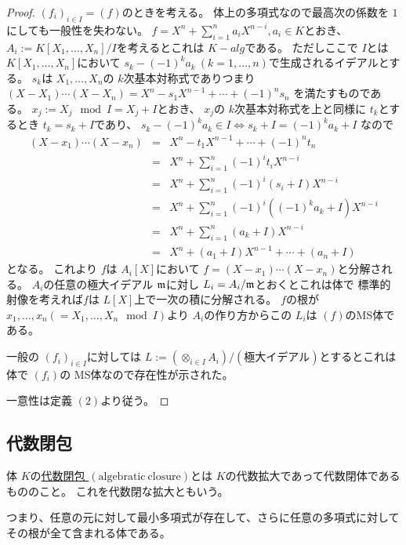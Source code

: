 \documentclass[../master_galois_theory]{subfiles}
\begin{document}
\begin{proof}
  $(f_i)_{i \in I} = (f)$のときを考える。
  体上の多項式なので最高次の係数を $1$にしても一般性を失わない。
  $f = X^n + \sum_{i = 1}^n a_i X^{n-i} , a_i \in K$とおき、
  $A_i := K[X_1 , \dots , X_n]/ I$を考えるとこれは $K-alg$である。
  ただしここで $I$とは $K[X_1 , \dots , X_n]$において
  $s_k - (-1)^k a_k \  (k = 1 , \dots , n)$で生成されるイデアルとする。
  $s_k$は $X_1 , \dots , X_n$の $k$次基本対称式でありつまり
  $(X - X_1) \cdots (X - X_n) = X^n - s_1 X^{n-1} + \cdots + (-1)^n s_n$
  を満たすものである。
  $x_j := X_j \mod I = X_j + I$とおき、 $x_j$の $k$次基本対称式を上と同様に $t_k$とするとき
  $t_k = s_k + I$であり、
  $s_k - (-1)^k a_k \in I \Leftrightarrow s_k + I = (-1)^k a_k + I$
  なので
  \begin{eqnarray*}
    (X - x_1) \cdots (X - x_n) & = & X^n - t_1 X^{n-1} + \cdots + (-1)^n t_n \\
    & = & X^n + \sum_{i=1}^n (-1)^i t_i X^{n-i} \\
    & = & X^n + \sum_{i=1}^n (-1)^i (s_i + I) X^{n-i} \\
    & = & X^n + \sum_{i=1}^n (-1)^i ((-1)^k a_k + I) X^{n-i} \\
    & = & X^n + \sum_{i=1}^n (a_k + I) X^{n-i} \\
    & = & X^n + (a_1 + I) X^{n-1} + \cdots + (a_n + I)
  \end{eqnarray*}
  となる。
  これより $f$は $A_i[X]$において $f = (X - x_1) \cdots (X - x_n)$と分解される。
  $A_i$の任意の極大イデアル $\mathfrak{m}$に対し $L_i = A_i/\mathfrak{m}$とおくとこれは体で
  標準的射像を考えれば$f$は $L[X]$上で一次の積に分解される。
  $f$の根が $x_1 , \dots , x_n (= X_1 , \dots , X_n \mod I)$より
  $A_i$の作り方からこの $L_i$は $(f)$の\rm{MS}体である。

  一般の $(f_i)_{i \in I}$に対しては
  $L := (\otimes_{i \in I} A_i) / (極大イデアル)$とするとこれは体で
  $(f_i)$の \rm{MS}体なので存在性が示された。

  一意性は定義 $(2)$より従う。
\end{proof}

\subsection{代数閉包}

\begin{defi}
  体 $K$の\underline{代数閉包 $(\mathrm{algebratic \  closure})$}とは
  $K$の代数拡大であって代数閉体であるもののこと。
  これを代数閉な拡大ともいう。

  つまり、任意の元に対して最小多項式が存在して、さらに任意の多項式に対してその根が全て含まれる体である。
\end{defi}
\end{document}
